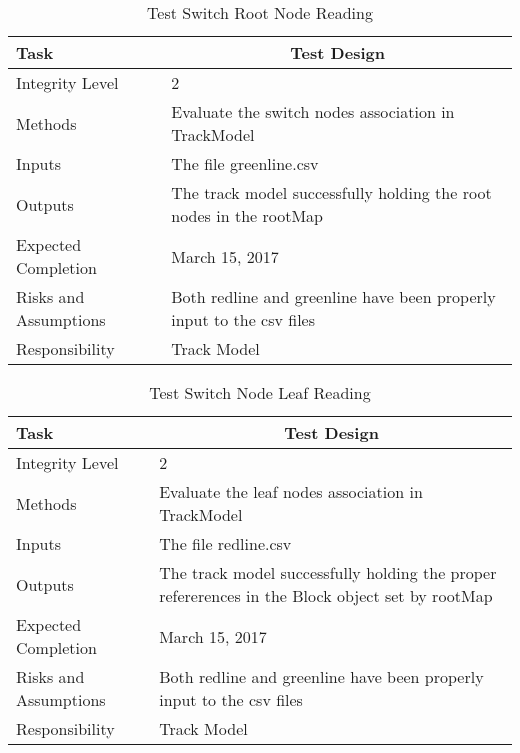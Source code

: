 \documentclass[]{article}
\begin{document}
\begin{table}[H]
	\centering
	\caption{Test Switch Root Node Reading}
	\begin{tabular}{|l|l|}
		\hline
		Task & \multicolumn{1}{c|}{Test Design} \\ \hline
		Integrity Level & 2 \\ \hline
		Methods & Evaluate the switch nodes association in TrackModel\\ \hline
		Inputs &  The file greenline.csv \\ \hline
		Outputs &  The track model successfully holding the root nodes in the rootMap\\ \hline
		Expected Completion & March 15, 2017\\ \hline
		Risks and Assumptions & Both redline and greenline have been properly input to the csv files \\ \hline
		Responsibility & Track Model\\ \hline
	\end{tabular}
\end{table}

\begin{table}[H]
	\centering
	\caption{Test Switch Node Leaf Reading}
	\begin{tabular}{|l|l|}
		\hline
		Task & \multicolumn{1}{c|}{Test Design} \\ \hline
		Integrity Level & 2 \\ \hline
		Methods & Evaluate the leaf nodes association in TrackModel\\ \hline
		Inputs &  The file redline.csv \\ \hline
		Outputs & \parbox[t]{10cm}{ The track model successfully holding the proper refererences in the Block object set by rootMap}\\ \hline
		Expected Completion & March 15, 2017\\ \hline
		Risks and Assumptions & Both redline and greenline have been properly input to the csv files \\ \hline
		Responsibility & Track Model\\ \hline
	\end{tabular}
\end{table}
\end{document}

